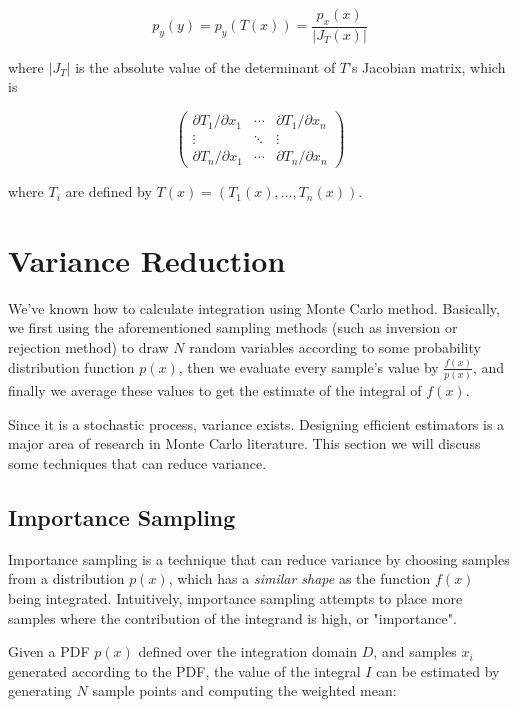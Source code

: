 \begin{equation}
	p_y(y)=p_y(T(x))=\frac{p_x(x)}{|J_T(x)|}	
\end{equation}

where $|J_T|$ is the absolute value of the determinant of $T$'s Jacobian matrix, which is

\begin{equation}
	\begin{pmatrix}
  	\partial{T_1}/\partial{x_1} & \cdots & \partial{T_1}/\partial{x_n} \\
  	\vdots                      & \ddots & \vdots \\
  	\partial{T_n}/\partial{x_1} & \cdots & \partial{T_n}/\partial{x_n}
	\end{pmatrix}
\end{equation}

where $T_i$ are defined by $T(x) = (T_1(x), . . . , T_n(x))$.



\section{Variance Reduction}\label{sec:Variance-Reduction}
We've known how to calculate integration using Monte Carlo method. Basically, we first using the aforementioned sampling methods (such as inversion or rejection method) to draw $N$ random variables according to some probability distribution function $p(x)$, then we evaluate every sample's value by $\frac{f(x)}{p(x)}$, and finally we average these values to get the estimate of the integral of $f(x)$. 

Since it is a stochastic process, variance exists. Designing efficient estimators is a major area of research in Monte Carlo literature. This section we will discuss some techniques that can reduce variance.




\subsection{Importance Sampling}
Importance sampling is a technique that can reduce variance by choosing samples from a distribution $p(x)$, which has a \textit{similar shape} as the function $f(x)$ being integrated. Intuitively, importance sampling attempts to place more samples where the contribution of the integrand is high, or "importance".

Given a PDF $p(x)$ defined over the integration domain $D$, and samples $x_i$ generated according to the PDF, the value of the integral $I$ can be estimated by generating $N$ sample points and computing the weighted mean:

